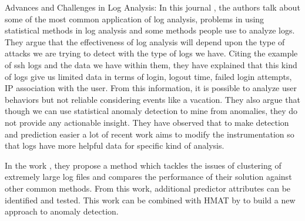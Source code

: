 \documentclass [11pt]{article}
\begin{document}
Advances and Challenges in Log Analysis: 
In this journal \cite{Oliner2012}, the authors talk about some of the most common application of log analysis, problems in using statistical methods in log analysis and some methods people use to analyze logs. They argue that the effectiveness of log analysis will depend upon the type of attacks we are trying to detect with the type of logs we have. Citing the example of ssh logs and the data we have within them, they have explained that this kind of logs give us limited data in terms of login, logout time, failed login attempts, IP association with the user. From this information, it is possible to analyze user behaviors but not reliable considering events like a vacation. They also argue that though we can use statistical anomaly detection to mine from anomalies, they do not provide any actionable insight. They have observed that to make detection and prediction easier a lot of recent work aims to modify the instrumentation so that logs have more helpful data for specific kind of analysis. 

In the work \cite{Taerat2011}, they propose a method which tackles the 
issues of clustering of extremely large log files and compares the performance of their
solution against other common methods. From this work, additional predictor attributes can be identified and tested. This work can be combined with HMAT by \cite{Frei2008} to build a new approach to anomaly detection.
\end{document}
